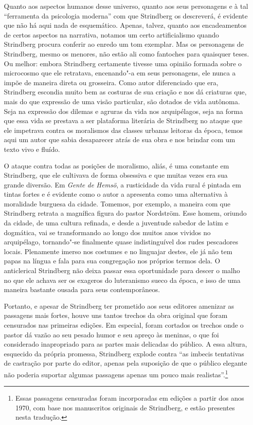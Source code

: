 Quanto aos aspectos humanos desse universo, quanto aos seus personagens
e à tal “ferramenta da psicologia moderna” com que Strindberg
os descreverá, é evidente que não há aqui nada de esquemático. Apenas,
talvez, quanto aos encadeamentos de certos aspectos na narrativa,
notamos um certo artificialismo quando Strindberg procura conferir ao enredo 
um tom exemplar. Mas os personagens de Strindberg, mesmo os
menores, não estão ali como fantoches para quaisquer teses. Ou melhor:
embora Strindberg certamente tivesse uma opinião formada sobre o
microcosmo que ele retratava, encenando"-a em seus personagens, ele
nunca a impõe de maneira direta ou grosseira. Como autor diferenciado
que era, Strindberg escondia muito bem as costuras de sua criação e nos
dá criaturas que, mais do que expressão de uma visão particular, são
dotados de vida autônoma. Seja na expressão dos dilemas e agruras da
vida nos arquipélagos, seja na forma que essa vida se prestava a ser
plataforma literária de Strindberg no ataque que ele impetrava contra
os moralismos das classes urbanas leitoras da época, temos aqui um
autor que sabia desaparecer atrás de sua obra e nos brindar com um
texto vivo e fluído. 

O ataque contra todas as posições de moralismo, aliás, é uma constante
em Strindberg, que ele cultivava de forma obsessiva e que
muitas vezes era sua grande diversão. Em \textit{Gente de Hemsö}, a
rusticidade da vida rural é pintada em tintas fortes e é evidente como
o autor a apresenta como uma alternativa à moralidade burguesa da
cidade. Tomemos, por exemplo, a maneira com que Strindberg retrata a
magnífica figura do pastor Nordström. Esse homem, oriundo da cidade, 
de uma cultura refinada, e desde a juventude sabedor de latim e
dogmática, vai se transformando ao longo dos muitos anos vividos
no arquipélago, tornando"-se finalmente quase indistinguível dos rudes
pescadores locais. Plenamente imerso nos costumes e no
linguajar destes, ele já não tem papas na língua e fala para sua
congregação nos próprios termos dela. O anticlerical Strindberg não deixa
passar essa oportunidade para descer o malho no que ele achava ser os
exageros do luteranismo sueco da época, e isso de uma maneira bastante
ousada para seus contemporâneos. 

Portanto, e apesar de Strindberg ter prometido aos seus editores 
amenizar as passagens mais fortes, houve uns tantos trechos da obra
original que foram censurados nas primeiras edições. Em especial, foram
cortados os trechos onde o pastor dá vazão ao seu pesado humor e seu 
apreço às meninas, o que foi considerado inapropriado para as partes 
mais delicadas do público. A essa altura, esquecido da própria promessa, 
Strindberg explode contra ``as imbecis tentativas de castração por parte 
do editor, apenas pela suposição de que o público elegante não poderia
suportar algumas passagens apenas um pouco mais realistas''.\footnote{ Essas passagens
censuradas foram incorporadas em edições a partir dos anos 1970, com base 
nos manuscritos originais de Strindberg, e estão presentes nesta tradução.}

